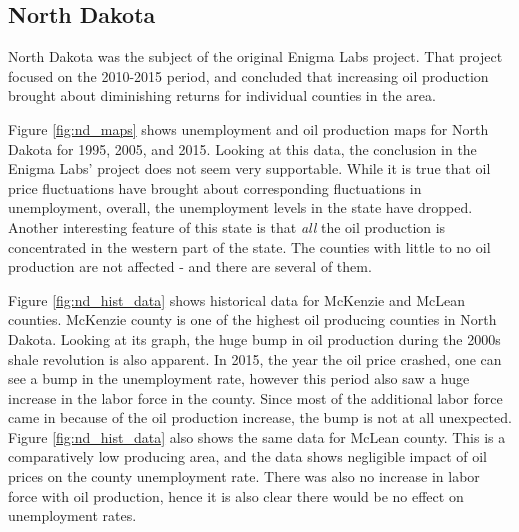 \documentclass[11pt,letterpaper]{article}
\begin{document}
\subsection{North Dakota}

North Dakota was the subject of the original Enigma Labs project. That project focused on the 2010-2015 period, and concluded that increasing oil production brought about diminishing returns for individual counties in the area. 

Figure \ref{fig:nd_maps} shows unemployment and oil production maps for North Dakota for 1995, 2005, and 2015. Looking at this data, the conclusion in the Enigma Labs' project does not seem very supportable. While it is true that oil price fluctuations have brought about corresponding fluctuations in unemployment, overall, the unemployment levels in the state have dropped. Another interesting feature of this state is that \emph{all} the oil production is concentrated in the western part of the state. The counties with little to no oil production are not affected - and there are several of them.

Figure \ref{fig:nd_hist_data} shows historical data for McKenzie and McLean counties. McKenzie county is one of the highest oil producing counties in North Dakota. Looking at its graph, the huge bump in oil production during the 2000s shale revolution is also apparent. In 2015, the year the oil price crashed, one can see a bump in the unemployment rate, however this period also saw a huge increase in the labor force in the county. Since most of the additional labor force came in because of the oil production increase, the bump is not at all unexpected. Figure \ref{fig:nd_hist_data} also shows the same data for McLean county. This is a comparatively low producing area, and the data shows negligible impact of oil prices on the county unemployment rate. There was also no increase in labor force with oil production, hence it is also clear there would be no effect on unemployment rates.
\end{document}
